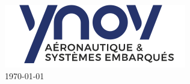 \documentclass[
11pt, %
french, %
singlespacing, %
headsepline, %
]{MastersDoctoralThesis} %
\begin{document}
\begin{titlepage}
\begin{center}
\includegraphics[scale=0.7]{Figures/Logo_Ynov.png}\\[1cm] %

{\large \today}\\[4cm] %

 
\vfill
\end{center}
\end{titlepage}



 
\end{document}
